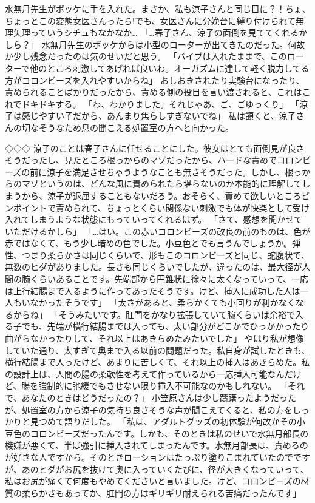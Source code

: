 水無月先生がポッケに手を入れた。まさか、私も涼子さんと同じ目に？！ちょ、ちょっとこの変態女医さんったら!でも、女医さんに分娩台に縛り付けられて無理矢理っていうシチュもなかなか…
「…春子さん、涼子の面倒を見ててくれるかしら？」
水無月先生のポッケからは小型のローターが出てきたのだった。何故か少し残念だったのは気のせいだと思う。
「バイブは入れたままで、このローターで他のところ刺激してあげれば良いわ。オーガズムに達して軽く脱力してる方がコロンビーズを入れやすいからね」
おしおきされたり実験台になったり、責められることばかりだったから、責める側の役目を言い渡されると、これはこれでドキドキする。
「わ、わかりました。それじゃあ、ご、ごゆっくり」
「涼子は感じやすい子だから、あんまり焦らしすぎないでね」
私は頷くと、涼子さんの切なそうなため息の聞こえる処置室の方へと向かった。


◇◇◇
涼子のことは春子さんに任せることにした。彼女はとても面倒見が良さそうだったし、見たところ根っからのマゾだったから、ハードな責めでコロンビーズの前に涼子を満足させちゃうようなことも無さそうだった。しかし、根っからのマゾというのは、どんな風に責められたら堪らないのか本能的に理解してしまうから、涼子が退屈することもないだろう。おそらく、責めて欲しいところピンポイントで責められて、ちょっとくらい関係ない刺激でも体が快楽として受け入れてしまうような状態にもっていってくれるはず。
「さて、感想を聞かせていただけるかしら」
「…はい。この赤いコロンビーズの改良の前のものは、色が赤ではなくて、もう少し暗めの色でした。小豆色とでも言うんでしょうか。弾性、つまり柔らかさは同じくらいで、形もこのコロンビーズと同じ、蛇腹状で、無数のヒダがありました。長さも同じくらいでしたが、違ったのは、最大径が人間の腕くらいあることです。先端部から円錐状に徐々に太くなっていって、一応は上行結腸まで入るように作ってあったそうです。けど、挿入に成功した人は一人もいなかったそうです」
「太さがあると、柔らかくても小回りが利かなくなるからね」
「そうみたいです。肛門をかなり拡張していて腕くらいは余裕で入る子でも、先端が横行結腸までは入っても、太い部分がどこかでひっかかったり曲がらなかったりして、それ以上はあきらめたみたいでした」
やはり私が想像していた通り、太すぎて奥まで入る以前の問題だった。私自身が試したときも、横行結腸まで入ったけど、あまりに苦しくて、それ以上の挿入はあきらめた。私の設計上は、人間の腸の柔軟性を考えて作っているから一応挿入可能なんだけど、腸を強制的に弛緩でもさせない限り挿入不可能なのかもしれない。
「それで、あなたのときはどうだったの？」
小笠原さんは少し躊躇ったようだったが、処置室の方から涼子の気持ち良さそうな声が聞こえてくると、私の方をしっかりと見つめて語りだした。
「私は、アダルトグッズの初体験が何故かその小豆色のコロンビーズだったんです。しかも、そのときは私のせいで水無月部長の機嫌が悪くて、半ば強引に挿入されてしまったんです。水無月部長は、責めるのが好きな人ですから。そのときローションはたっぷり塗りこまれていたのでですが、あのヒダがお尻を抜けて奥に入っていくたびに、径が大きくなっていって、私はお尻が痛くて何度もやめてくださいと言いました。けど、コロンビーズの材質の柔らかさもあってか、肛門の方はギリギリ耐えられる苦痛だったんです」
